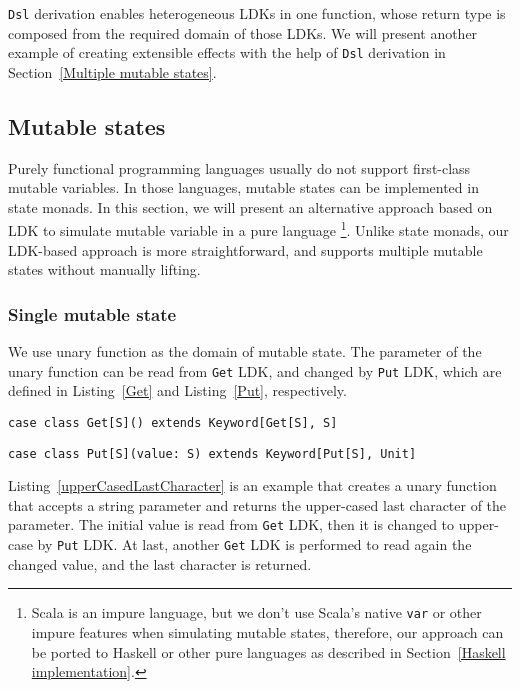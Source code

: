 \lstinline{Dsl} derivation enables heterogeneous LDKs in one function, whose return type is composed from the required domain of those LDKs. We will present another example of creating extensible effects with the help of \lstinline{Dsl} derivation in Section~\ref{Multiple mutable states}.

\subsection{Mutable states}

Purely functional programming languages usually do not support first-class mutable variables. In those languages, mutable states can be implemented in state monads. In this section, we will present an alternative approach based on LDK to simulate mutable variable in a pure language \footnote{Scala is an impure language, but we don't use Scala's native \lstinline{var} or other impure features when simulating mutable states, therefore, our approach can be ported to Haskell or other pure languages as described in Section~\ref{Haskell implementation}.}. Unlike state monads, our LDK-based approach is more straightforward, and supports multiple mutable states without manually lifting.

\subsubsection{Single mutable state}

We use unary function as the domain of mutable state. The parameter of the unary function can be read from \lstinline{Get} LDK, and changed by \lstinline{Put} LDK, which are defined in Listing~\ref{Get} and Listing~\ref{Put}, respectively.

\begin{lstlisting}[caption={The definition of \lstinline{Get} LDK},label={Get}]
case class Get[S]() extends Keyword[Get[S], S]
\end{lstlisting}

\begin{lstlisting}[caption={The definition of \lstinline{Put} LDK},label={Put}]
case class Put[S](value: S) extends Keyword[Put[S], Unit]
\end{lstlisting}

Listing~\ref{upperCasedLastCharacter} is an example that creates a unary function that accepts a string parameter and returns the upper-cased last character of the parameter. The initial value is read from \lstinline{Get} LDK, then it is changed to upper-case by \lstinline{Put} LDK. At last, another \lstinline{Get} LDK is performed to read again  the changed value, and the last character is returned.

